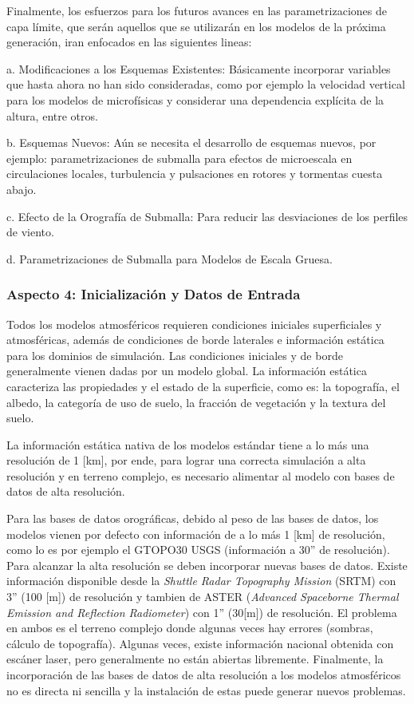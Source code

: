 Finalmente, los esfuerzos para los futuros avances en las parametrizaciones de capa límite, que serán aquellos que se utilizarán en los modelos de la próxima generación, iran enfocados en las siguientes lineas:
\begin{enumerate*}
	\item[a.] Modificaciones a los Esquemas Existentes: Básicamente incorporar variables que hasta ahora no han sido consideradas, como por ejemplo la velocidad vertical para los modelos de microfísicas y considerar una dependencia explícita de la altura, entre otros.
	\item[b.] Esquemas Nuevos: Aún se necesita el desarrollo de esquemas nuevos, por ejemplo: parametrizaciones de submalla para efectos de microescala en circulaciones locales, turbulencia y pulsaciones en rotores y tormentas cuesta abajo.
	\item[c.] Efecto de la Orografía de Submalla: Para reducir las desviaciones de los perfiles de viento.
	\item[d.] Parametrizaciones de Submalla para Modelos de Escala Gruesa.
\end{enumerate*}

\subsubsection{Aspecto 4: Inicialización y Datos de Entrada}
Todos los modelos atmosféricos requieren condiciones iniciales superficiales y atmosféricas, además de condiciones de borde laterales e información estática para los dominios de simulación. Las condiciones iniciales y de borde generalmente vienen dadas por un modelo global. La información estática caracteriza las propiedades y el estado de la superficie, como es: la topografía, el albedo, la categoría de uso de suelo, la fracción de vegetación y la textura del suelo.

La información estática nativa de los modelos estándar tiene a lo más una resolución de 1 [km], por ende, para lograr una correcta simulación a alta resolución y en terreno complejo, es necesario alimentar al modelo con bases de datos de alta resolución.

Para las bases de datos orográficas, debido al peso de las bases de datos, los modelos vienen por defecto con información de a lo más 1 [km] de resolución, como lo es por ejemplo el GTOPO30 USGS (información a 30'' de resolución). Para alcanzar la alta resolución se deben incorporar nuevas bases de datos. Existe información disponible desde la \emph{Shuttle Radar Topography Mission} (SRTM) con 3'' (100 [m]) de resolución y tambien de ASTER (\emph{Advanced Spaceborne Thermal Emission and Reflection Radiometer}) con 1'' (30[m]) de resolución. El problema en ambos es el terreno complejo donde algunas veces hay errores (sombras, cálculo de topografía). Algunas veces, existe información nacional obtenida con escáner laser, pero generalmente no están abiertas libremente. Finalmente, la incorporación de las bases de datos de alta resolución a los modelos atmosféricos no es directa ni sencilla y la instalación de estas puede generar nuevos problemas.

